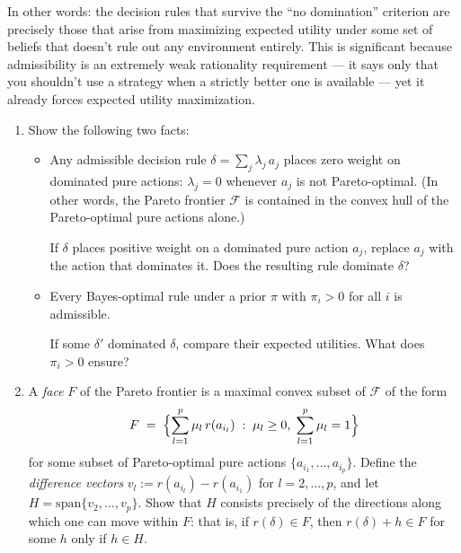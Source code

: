 \documentclass[11pt]{article}
\begin{document}
\begin{exercise}
\medskip
\noindent
In other words: the decision rules that survive the ``no domination'' criterion are
precisely those that arise from maximizing expected utility under some set of beliefs
that doesn't rule out any environment entirely. This is significant because
admissibility is an extremely weak rationality requirement --- it says only that you
shouldn't use a strategy when a strictly better one is available --- yet it already
forces expected utility maximization.

\begin{enumerate}
\item \label{ex:complete-class-a} Show the following two facts:
\begin{itemize}
  \item[(i)] Any admissible decision rule $\delta = \sum_j \lambda_j\, a_j$ places
    zero weight on dominated pure actions: $\lambda_j = 0$ whenever $a_j$ is not
    Pareto-optimal. (In other words, the Pareto frontier $\mathcal{F}$ is contained
    in the convex hull of the Pareto-optimal pure actions alone.)
    \begin{hint}
    If $\delta$ places positive weight on a dominated pure action $a_j$,
    replace $a_j$ with the action that dominates it. Does the resulting rule dominate
    $\delta$?
    \end{hint}
  \item[(ii)] Every Bayes-optimal rule under a prior $\pi$ with $\pi_i > 0$ for all
    $i$ is admissible.
    \begin{hint}
    If some $\delta'$ dominated $\delta$, compare their expected
    utilities. What does $\pi_i > 0$ ensure?
    \end{hint}
\end{itemize}

\item \label{ex:complete-class-b} A \emph{face} $F$ of the Pareto frontier is a maximal convex
subset of $\mathcal{F}$ of the form
\[
  F \;=\; \Bigl\{\sum_{l=1}^p \mu_l\, r(a_{i_l}) \;:\;
  \mu_l \geq 0,\; \sum_{l=1}^p \mu_l = 1\Bigr\}
\]
for some subset of Pareto-optimal pure actions $\{a_{i_1}, \ldots, a_{i_p}\}$. Define
the \emph{difference vectors} $v_l := r(a_{i_l}) - r(a_{i_1})$ for
$l = 2, \ldots, p$, and let $H = \mathrm{span}\{v_2, \ldots, v_p\}$. Show that $H$
consists precisely of the directions along which one can move within $F$: that is, if
$r(\delta) \in F$, then $r(\delta) + h \in F$ for some $h$ only if $h \in H$.


\end{enumerate}
\end{exercise}
\end{document}
